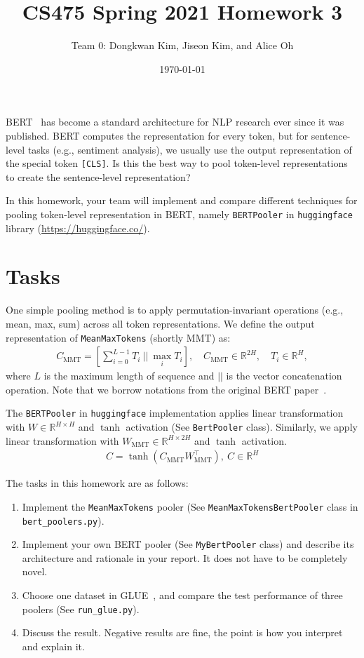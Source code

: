 \documentclass[UTF8]{article}
\title{CS475 Spring 2021 Homework 3}
\author{
  Team 0:  %
  Dongkwan Kim, Jiseon Kim, and Alice Oh  %
}
\date{\today}
\begin{document}
\maketitle

BERT~\cite{devlin-etal-2019-bert} has become a standard architecture for NLP research ever since it was published. BERT computes the representation for every token, but for sentence-level tasks (e.g., sentiment analysis), we usually use the output representation of the special token \texttt{[CLS]}. Is this the best way to pool token-level representations to create the sentence-level representation?

In this homework, your team will implement and compare different techniques for pooling token-level representation in BERT, namely \texttt{BERTPooler} in \texttt{huggingface} library (\url{https://huggingface.co/}).

\section{Tasks}

One simple pooling method is to apply permutation-invariant operations (e.g., mean, max, sum) across all token representations. We define the output representation of \texttt{MeanMaxTokens} (shortly MMT) as:
\begin{align}
  C_{\text{MMT}} = \left[
    \textstyle \sum_{i=0}^{L - 1} T_{i}\ ||\ \max_i T_{i}
  \right],\quad
   C_{\text{MMT}} \in \mathbb{R}^{2H},\quad
   T_i \in \mathbb{R}^{H},
\end{align}
where $L$ is the maximum length of sequence and $||$ is the vector concatenation operation. Note that we borrow notations from the original BERT paper~\cite{devlin-etal-2019-bert}. 

The \texttt{BERTPooler} in \texttt{huggingface} implementation applies linear transformation with $W \in \mathbb{R}^{H \times H}$ and $\tanh$ activation (See \texttt{BertPooler} class). Similarly, we apply linear transformation with $W_{\text{MMT}} \in \mathbb{R}^{H \times 2H}$ and $\tanh$ activation.
\begin{align}
  C = \tanh(C_{\text{MMT}}W_{\text{MMT}}^\top),\ C \in \mathbb{R}^{H}
\end{align}

The tasks in this homework are as follows:
\begin{enumerate}
  \item Implement the \texttt{MeanMaxTokens} pooler (See \texttt{MeanMaxTokensBertPooler} class in \texttt{bert\_poolers.py}).
  \item Implement your own BERT pooler (See \texttt{MyBertPooler} class) and describe its architecture and rationale in your report. It does not have to be completely novel.
  \item Choose one dataset in GLUE~\cite{wang2018glue}, and compare the test performance of three poolers (See \texttt{run\_glue.py}).
  \item Discuss the result. Negative results are fine, the point is how you interpret and explain it.
\end{enumerate}
\end{document}

